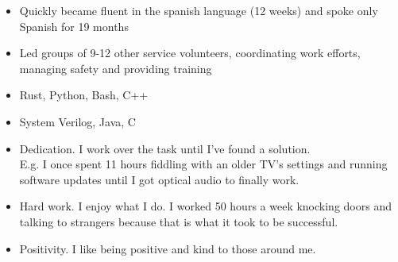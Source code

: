 	\divider

	\begin{itemize}
		\item Quickly became fluent in the spanish language (12 weeks) and spoke
			only Spanish for 19 months
			\smallskip
		\item Led groups of 9-12 other service volunteers, coordinating work
			efforts, managing safety and providing training
	\end{itemize}



	\smallskip
	\begin{itemize}
		\item Rust, Python, Bash, C++
		\item System Verilog, Java, C
	\end{itemize}

	\smallskip
	\begin{itemize}
		\item Dedication. I work over the task until I've found a solution. \\ E.g. I
			once spent 11 hours fiddling with an older TV's settings and running
			software updates until I got optical audio to finally work.
			\smallskip
		\item Hard work. I enjoy what I do. I worked 50 hours a week knocking doors and talking to
			strangers because that is what it took to be successful.
			\smallskip
		\item Positivity. I like being positive and kind to those around me.
	\end{itemize}


